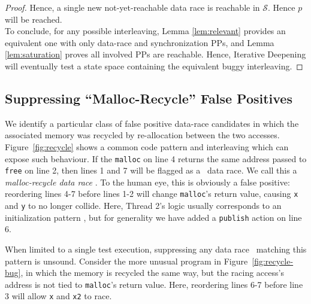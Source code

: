 \begin{proof}
Hence, a single new not-yet-reachable data race is reachable in $\mathcal{S}$. Hence $p$ will be reached.
\\

To conclude,
for any possible interleaving, Lemma \ref{lem:relevant} provides an equivalent one with only data-race and synchronization PPs,
and Lemma \ref{lem:saturation} proves all involved PPs are reachable.
Hence, Iterative Deepening will eventually test a state space containing the equivalent buggy interleaving.
\end{proof}


\subsection{Suppressing ``Malloc-Recycle'' False Positives}
\label{sec:recycle}

We identify a particular class of false positive data-race candidates  in which the associated memory was recycled by re-allocation between the two accesses.
Figure~\ref{fig:recycle} shows a common code pattern and interleaving which can expose such behaviour.
If the {\tt malloc} on line 4 returns the same address passed to {\tt free} on line 2, then lines 1 and 7 will be flagged as a ~data race.
We call this a {\em malloc-recycle data race }.
To the human eye, this is obviously a false positive: reordering lines 4-7 before lines 1-2 will change {\tt malloc}'s return value, causing {\tt x} and {\tt y} to no longer collide.
Here, Thread 2's logic usually corresponds to an initialization pattern \cite{eraser}, but for generality we have added a {\tt publish} action on line 6.

When limited to a single test execution, suppressing any data race ~matching this pattern is unsound.
Consider the more unusual program in Figure~\ref{fig:recycle-bug},
in which the memory is recycled the same way, but the racing access's address is not tied to {\tt malloc}'s return value.
Here, reordering lines 6-7 before line 3 will allow {\tt x} and {\tt x2} to race.

